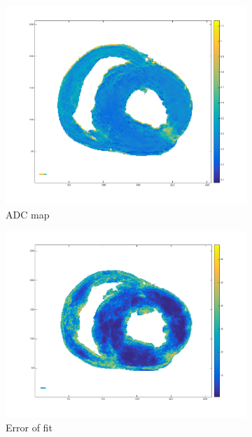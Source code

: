 \begin{figure}[h!]
    \centering
    \begin{subfigure}{.31\textwidth}
        \includegraphics[width=\textwidth]{figures/pig2_adc_31}
        \caption{ADC map}
        \label{fig:pig2_adc}
    \end{subfigure}
    \begin{subfigure}{.31\textwidth}
        \includegraphics[width=\textwidth]{figures/pig2_err_31}
        \caption{Error of fit}
        \label{fig:pig2_err}
    \end{subfigure}
    \begin{subfigure}{.31\textwidth}

\end{subfigure}
\end{figure}
